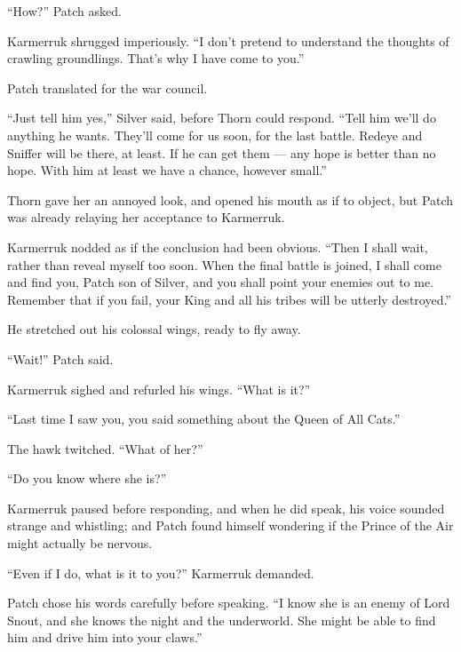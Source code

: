 \documentclass[ebook,oneside,openany,17pt]{memoir}
\newenvironment{tolerant}[1]{%
  \par\tolerance=#1\relax
}{%
  \par
}
\begin{document}
“How?” Patch asked.

\begin{tolerant}{500}
Karmerruk shrugged imperiously. “I don’t pretend to understand the
thoughts of crawling groundlings. That’s why I have come to you.”
\end{tolerant}

Patch translated for the war council.

\begin{tolerant}{2000}
“Just tell him yes,” Silver said, before Thorn could respond. “Tell
him we’ll do anything he wants. They’ll come for us soon, for the last
battle. Redeye and Sniffer will be there, at least. If he can get them
— any hope is better than no hope. With him at least we have a chance,
however small.”
\end{tolerant}

Thorn gave her an annoyed look, and opened his mouth as if to object,
but Patch was already relaying her acceptance to Karmerruk.

Karmerruk nodded as if the conclusion had been obvious. “Then I shall
wait, rather than reveal myself too soon. When the final battle is
joined, I shall come and find you, Patch son of Silver, and you shall
point your enemies out to me. Remember that if you fail, your King and
all his tribes will be utterly destroyed.”

He stretched out his colossal wings, ready to fly away.

“Wait!” Patch said.

Karmerruk sighed and refurled his wings. “What is it?”

“Last time I saw you, you said something about the Queen of All Cats.”

The hawk twitched. “What of her?”

“Do you know where she is?”

\begin{tolerant}{2000}
Karmerruk paused before responding, and when he did speak, his voice
sounded strange and whistling; and Patch found himself wondering if
the Prince of the Air might actually be nervous.
\end{tolerant}

“Even if I do, what is it to you?” Karmerruk demanded.

Patch chose his words carefully before speaking. “I know she is an
enemy of Lord Snout, and she knows the night and the underworld. She
might be able to find him and drive him into your claws.”
\end{document}
